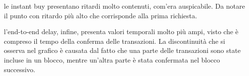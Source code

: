 le instant buy presentano ritardi molto contenuti, com'era auspicabile. Da notare il punto con ritardo più alto che corrisponde alla prima richiesta.

l'end-to-end delay, infine, presenta valori temporali molto più ampi, visto che è compreso il tempo della conferma delle transazioni. La discontinuità che si osserva nel grafico è causata dal fatto che una parte delle transazioni sono state incluse in un blocco, mentre un'altra parte è stata confermata nel blocco successivo.

